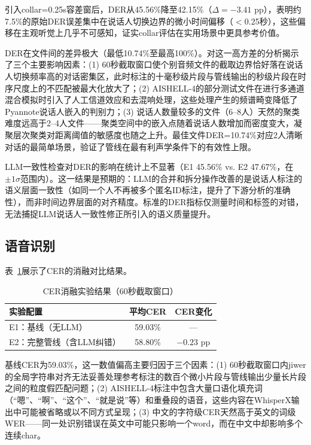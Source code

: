 \documentclass[12pt, a4paper]{article}
\begin{document}
引入collar=0.25s容差窗后，DER从45.56\%降至42.15\%（$\Delta = -3.41$ pp），表明约7.5\%的原始DER误差集中在说话人切换边界的微小时间偏移（$<$0.25秒），这些偏移在主观听觉上几乎不可感知，证实collar评估在实用场景中更具参考价值。

DER在文件间的差异极大（最低10.74\%至最高100\%）。对这一高方差的分析揭示了三个主要影响因素：(1) 60秒截取窗口使个别音频文件的截取边界恰好落在说话人切换频率高的对话密集区，此时标注的十毫秒级片段与管线输出的秒级片段在时序尺度上的不匹配被最大化放大了；(2) AISHELL-4的部分测试文件在进行多通道混合模拟时引入了人工信道效应和去混响处理，这些处理产生的频谱畸变降低了Pyannote说话人嵌入的判别力；(3) 说话人数量较多的文件（6--8人）天然的聚类难度远高于2--4人文件——聚类空间中的嵌入点随着说话人数增加而密度变大，凝聚层次聚类对距离阈值的敏感度也随之上升。最佳文件DER=10.74\%对应2人清晰对话的最简单场景，验证了管线在最有利声学条件下的有效性上限。

LLM一致性检查对DER的影响在统计上不显著（E1 45.56\% vs. E2 47.67\%，在$\pm1\sigma$范围内）。这一结果是预期的：LLM的合并和拆分操作改善的是说话人标注的语义层面一致性（如同一个人不再被多个匿名ID标注，提升了下游分析的准确性），而非时间边界层面的对齐精度。标准的DER指标仅测量时间和标签的对错，无法捕捉LLM说话人一致性修正所引入的语义质量提升。

\subsection{语音识别}

表~\ref{tab:cer}展示了CER的消融对比结果。

\begin{table}[H]
\centering
\caption{CER消融实验结果（60秒截取窗口）}
\label{tab:cer}
\begin{tabular}{lcc}
\toprule
\textbf{实验配置} & \textbf{平均CER} & \textbf{CER变化} \\
\midrule
E1：基线（无LLM） & 59.03\% & — \\
E2：完整管线（含LLM纠错） & 58.80\% & $-0.23$ pp \\
\bottomrule
\end{tabular}
\end{table}

基线CER为59.03\%，这一数值偏高主要归因于三个因素：(1) 60秒截取窗口内jiwer的全局字符串对齐无法妥善处理参考标注的数百个微小片段与管线输出少量长片段之间的粒度假匹配问题；(2) AISHELL-4标注中包含大量口语化填充词（``嗯''、``啊''、``这个''、``就是说''等）和重叠段的语音，这些内容在WhisperX输出中可能被省略或以不同方式呈现；(3) 中文的字符级CER天然高于英文的词级WER——同一处识别错误在英文中可能只影响一个word，而在中文中却影响多个连续char。
\end{document}

